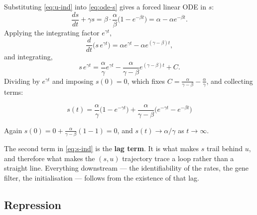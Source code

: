 \documentclass[11pt,a4paper]{article}
\newenvironment{keybox}{\begin{shaded}\noindent}{\end{shaded}}
\newcommand{\uns}{u}
\newcommand{\spl}{s}
\theoremstyle{definition}
\begin{document}
Substituting \eqref{eq:u-ind} into \eqref{eq:ode-s} gives a forced linear ODE
in $\spl$:
%
\begin{equation}
\frac{d\spl}{dt} + \gamma \spl
= \beta \cdot \frac{\alpha}{\beta}\Big(1 - e^{-\beta t}\Big)
= \alpha - \alpha e^{-\beta t}.
\end{equation}
%
Applying the integrating factor $e^{\gamma t}$,
%
\begin{equation}
\frac{d}{dt}\Big(\spl\, e^{\gamma t}\Big)
= \alpha e^{\gamma t} - \alpha e^{(\gamma - \beta) t},
\end{equation}
%
and integrating,
%
\begin{equation}
\spl\, e^{\gamma t}
= \frac{\alpha}{\gamma}e^{\gamma t}
- \frac{\alpha}{\gamma - \beta}e^{(\gamma - \beta)t} + C .
\end{equation}
%
Dividing by $e^{\gamma t}$ and imposing $\spl(0) = 0$, which fixes
$C = \frac{\alpha}{\gamma-\beta} - \frac{\alpha}{\gamma}$, and collecting terms:
%
\begin{keybox}
\begin{equation}
\boxed{\;\spl(t) = \frac{\alpha}{\gamma}\Big(1 - e^{-\gamma t}\Big)
+ \frac{\alpha}{\gamma - \beta}\Big(e^{-\gamma t} - e^{-\beta t}\Big)\;}
\label{eq:s-ind}
\end{equation}
\end{keybox}
%
Again $\spl(0) = 0 + \frac{\alpha}{\gamma-\beta}(1 - 1) = 0$, and
$\spl(t) \to \alpha/\gamma$ as $t \to \infty$.

The second term in \eqref{eq:s-ind} is the \textbf{lag term}. It is what makes
$\spl$ trail behind $\uns$, and therefore what makes the $(\spl,\uns)$ trajectory
trace a loop rather than a straight line. Everything downstream --- the
identifiability of the rates, the gene filter, the initialisation --- follows
from the existence of that lag.

\subsection{Repression}
\end{document}

